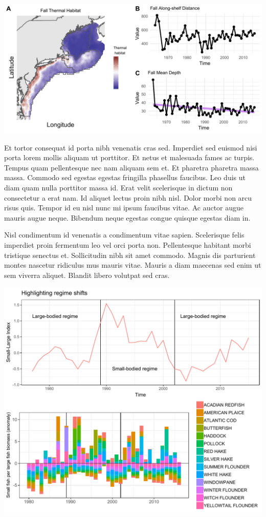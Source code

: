 \documentclass[11pt,]{article}
\begin{document}
\includegraphics{font_test_files/figure-latex/maps-1.pdf}

Et tortor consequat id porta nibh venenatis cras sed. Imperdiet sed
euismod nisi porta lorem mollis aliquam ut porttitor. Et netus et
malesuada fames ac turpis. Tempus quam pellentesque nec nam aliquam sem
et. Et pharetra pharetra massa massa. Commodo sed egestas egestas
fringilla phasellus faucibus. Leo duis ut diam quam nulla porttitor
massa id. Erat velit scelerisque in dictum non consectetur a erat nam.
Id aliquet lectus proin nibh nisl. Dolor morbi non arcu risus quis.
Tempor id eu nisl nunc mi ipsum faucibus vitae. Ac auctor augue mauris
augue neque. Bibendum neque egestas congue quisque egestas diam in.

Nisl condimentum id venenatis a condimentum vitae sapien. Scelerisque
felis imperdiet proin fermentum leo vel orci porta non. Pellentesque
habitant morbi tristique senectus et. Sollicitudin nibh sit amet
commodo. Magnis dis parturient montes nascetur ridiculus mus mauris
vitae. Mauris a diam maecenas sed enim ut sem viverra aliquet. Blandit
libero volutpat sed cras.

\includegraphics{font_test_files/figure-latex/unnamed-chunk-5-1.pdf}
\end{document}
